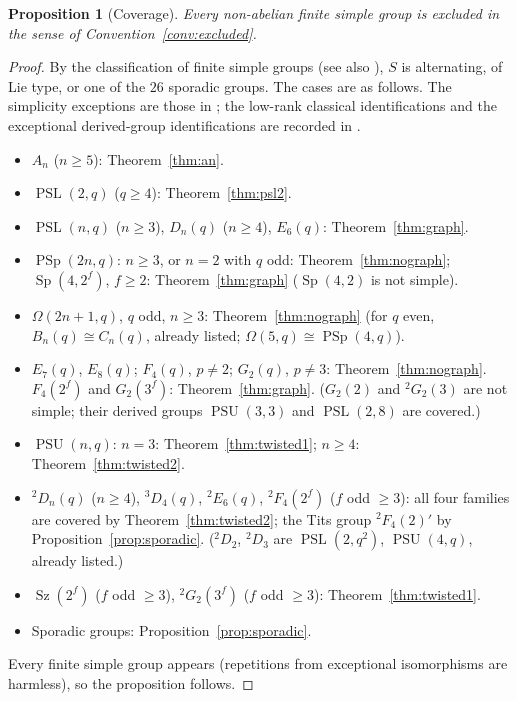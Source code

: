 \documentclass[11pt]{amsart}
\newtheorem{proposition}[theorem]{Proposition}
\theoremstyle{definition}
\theoremstyle{remark}
\DeclareMathOperator{\PSL}{PSL}
\DeclareMathOperator{\PSU}{PSU}
\DeclareMathOperator{\PSp}{PSp}
\DeclareMathOperator{\Sp}{Sp}
\DeclareMathOperator{\Sz}{Sz}
\begin{document}
\begin{proposition}[Coverage]\label{prop:coverage}
Every non-abelian finite simple group is excluded in the sense of
Convention~\ref{conv:excluded}.
\end{proposition}

\begin{proof}
By the classification of finite simple groups
\cite[Ch.~1, Table~I, pp.~8--10]{GLS1} (see also
\cite[Thm.~1.1]{RoneyDougal2021}), $S$ is alternating,
of Lie type, or one of the $26$ sporadic groups. The cases are as follows.
The simplicity exceptions are
those in \cite[Thm.~2.2.7(a)]{GLS3}; the low-rank classical
identifications and the exceptional derived-group identifications are
recorded in \cite[\S2.4, pp.~xi--xii, and \S3.5, p.~xv]{ATLAS}.
\begin{itemize}
\item $A_n$ ($n\geq5$): Theorem~\ref{thm:an}.
\item $\PSL(2,q)$ ($q\geq4$): Theorem~\ref{thm:psl2}.
\item $\PSL(n,q)$ ($n\geq3$), $D_n(q)$ ($n\geq4$), $E_6(q)$:
Theorem~\ref{thm:graph}.
\item $\PSp(2n,q)$: $n\geq3$, or $n=2$ with $q$ odd:
Theorem~\ref{thm:nograph}; $\Sp(4,2^f)$, $f\geq2$:
Theorem~\ref{thm:graph} ($\Sp(4,2)$ is not simple).
\item $\Omega(2n{+}1,q)$, $q$ odd, $n\geq3$: Theorem~\ref{thm:nograph}
(for $q$ even, $B_n(q)\cong C_n(q)$, already listed;
$\Omega(5,q)\cong\PSp(4,q)$).
\item $E_7(q)$, $E_8(q)$; $F_4(q)$, $p\neq2$; $G_2(q)$, $p\neq3$:
Theorem~\ref{thm:nograph}. $F_4(2^f)$ and $G_2(3^f)$:
Theorem~\ref{thm:graph}. ($G_2(2)$ and ${}^2G_2(3)$ are not simple;
their derived groups $\PSU(3,3)$ and $\PSL(2,8)$ are covered.)
\item $\PSU(n,q)$: $n=3$: Theorem~\ref{thm:twisted1}; $n\geq4$:
Theorem~\ref{thm:twisted2}.
\item ${}^2D_n(q)$ ($n\geq4$), ${}^3D_4(q)$, ${}^2E_6(q)$,
${}^2F_4(2^f)$ ($f$ odd $\geq3$): all four families are covered by
Theorem~\ref{thm:twisted2}; the Tits group ${}^2F_4(2)'$ by
Proposition~\ref{prop:sporadic}. (${}^2D_2$, ${}^2D_3$ are
$\PSL(2,q^2)$, $\PSU(4,q)$, already listed.)
\item $\Sz(2^f)$ ($f$ odd $\geq3$), ${}^2G_2(3^f)$ ($f$ odd $\geq3$):
Theorem~\ref{thm:twisted1}.
\item Sporadic groups: Proposition~\ref{prop:sporadic}.
\end{itemize}
Every finite simple group appears (repetitions from exceptional
isomorphisms are harmless), so the proposition follows.
\end{proof}
\end{document}
